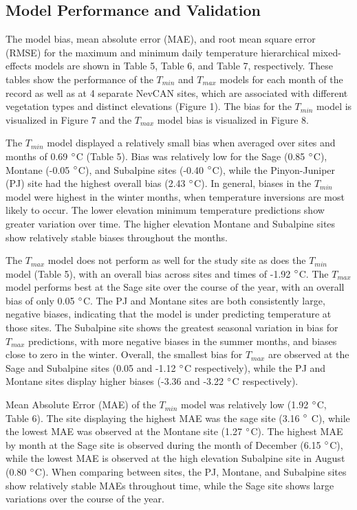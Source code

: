 \documentclass{ametsoc}
\begin{document}
\subsection{Model Performance and Validation} 
The model bias, mean absolute
error (MAE), and root mean square error (RMSE) for the maximum and minimum daily
temperature hierarchical mixed-effects models are shown in Table 5, Table 6, and
Table 7, respectively. These tables show the performance of the $T_{min}$ and
$T_{max}$ models for each month of the record as well as at 4 separate NevCAN
sites, which are associated with different vegetation types and distinct
elevations (Figure 1). The bias for the $T_{min}$ model is visualized in Figure
7 and the $T_{max}$ model bias is visualized in Figure 8.

The $T_{min}$ model displayed a relatively small bias when averaged over sites
and months of 0.69 $\degree$C (Table 5). Bias was relatively low for the Sage
(0.85 $\degree$C), Montane (-0.05 $\degree$C), and Subalpine sites (-0.40
$\degree$C), while the Pinyon-Juniper (PJ) site had the highest overall bias
(2.43 $\degree$C). In general, biases in the $T_{min}$ model were highest in the
winter months, when temperature inversions are most likely to occur. The lower
elevation minimum temperature predictions show greater variation over time. The
higher elevation Montane and Subalpine sites show relatively stable biases
throughout the months.

The $T_{max}$ model does not perform as well for the study site as does the
$T_{min}$ model (Table 5), with an overall bias across sites and times of -1.92
$\degree$C. The $T_{max}$ model performs best at the Sage site over the course
of the year, with an overall bias of only 0.05 $\degree$C. The PJ and Montane
sites are both consistently large, negative biases, indicating that the model is
under predicting temperature at those sites. The Subalpine site shows the
greatest seasonal variation in bias for $T_{max}$ predictions, with more
negative biases in the summer months, and biases close to zero in the winter.
Overall, the smallest bias for $T_{max}$ are observed at the Sage and Subalpine
sites (0.05 and -1.12 $\degree$C respectively), while the PJ and Montane sites
display higher biases (-3.36 and -3.22 $\degree$C respectively).

Mean Absolute Error (MAE) of the $T_{min}$ model was relatively low (1.92
$\degree$C, Table 6). The site displaying the highest MAE was the sage site
(3.16 $\degree$ C), while the lowest MAE was observed at the Montane site (1.27
$\degree$C). The highest MAE by month at the Sage site is observed during the
month of December (6.15 $\degree$C), while the lowest MAE is observed at the
high elevation Subalpine site in August (0.80 $\degree$C). When comparing
between sites, the PJ, Montane, and Subalpine sites show relatively stable MAEs
throughout time, while the Sage site shows large variations over the course of
the year.
\end{document}
